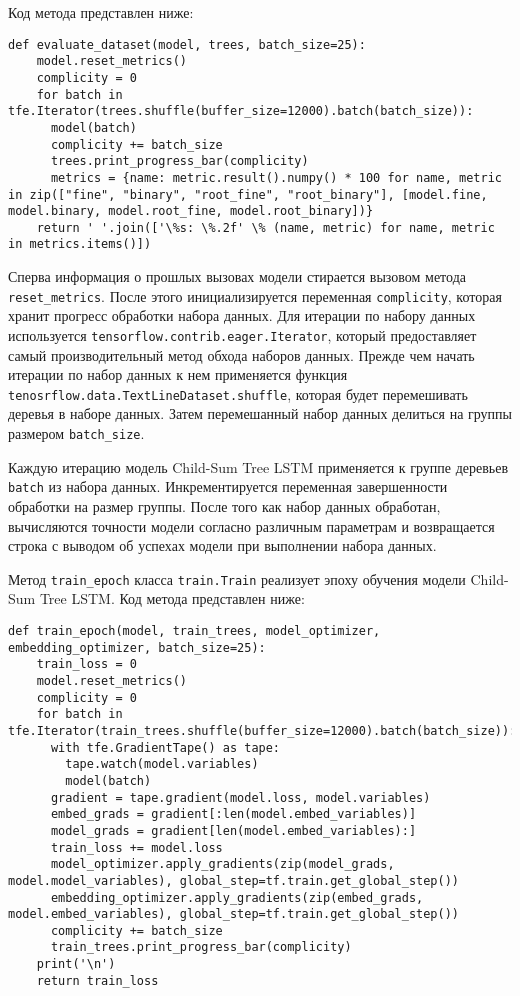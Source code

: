 Код метода представлен ниже:
\medskip
\begin{lstlisting}[style=Python]
  def evaluate_dataset(model, trees, batch_size=25):
    model.reset_metrics()
    complicity = 0
    for batch in tfe.Iterator(trees.shuffle(buffer_size=12000).batch(batch_size)):
      model(batch)
      complicity += batch_size
      trees.print_progress_bar(complicity)
      metrics = {name: metric.result().numpy() * 100 for name, metric in zip(["fine", "binary", "root_fine", "root_binary"], [model.fine, model.binary, model.root_fine, model.root_binary])}
    return ' '.join(['\%s: \%.2f' \% (name, metric) for name, metric in metrics.items()])
\end{lstlisting}
\medskip

Сперва информация о прошлых вызовах модели стирается вызовом метода \texttt{reset\_metrics}. После этого инициализируется переменная \texttt{comp\-licity}, которая хранит прогресс обработки набора данных. Для итерации по набору данных используется \texttt{tensorflow.contrib.eager.Iterat\-or}, который предоставляет самый производительный метод обхода наборов данных. Прежде чем начать итерации по набор данных к нем применяется функция \texttt{tenosr\-flow.data.TextLineDataset.shuffle}, которая будет перемешивать деревья в наборе данных. Затем перемешанный набор данных делиться на группы размером \texttt{batch\_size}.

Каждую итерацию модель Child-Sum Tree LSTM применяется к группе деревьев \texttt{batch} из набора данных. Инкрементируется переменная завершенности обработки на размер группы. После того как набор данных обработан, вычисляются точности модели согласно различным параметрам и возвращается строка с выводом об успехах модели при выполнении набора данных.

Метод \texttt{train\_epoch} класса \texttt{train.Train} реализует эпоху обучения модели Child-Sum Tree LSTM\@. Код метода представлен ниже:
\medskip
\begin{lstlisting}[style=Python]
  def train_epoch(model, train_trees, model_optimizer, embedding_optimizer, batch_size=25):
    train_loss = 0
    model.reset_metrics()
    complicity = 0
    for batch in tfe.Iterator(train_trees.shuffle(buffer_size=12000).batch(batch_size)):
      with tfe.GradientTape() as tape:
        tape.watch(model.variables)
        model(batch)
      gradient = tape.gradient(model.loss, model.variables)
      embed_grads = gradient[:len(model.embed_variables)]
      model_grads = gradient[len(model.embed_variables):]
      train_loss += model.loss
      model_optimizer.apply_gradients(zip(model_grads, model.model_variables), global_step=tf.train.get_global_step())
      embedding_optimizer.apply_gradients(zip(embed_grads, model.embed_variables), global_step=tf.train.get_global_step())
      complicity += batch_size
      train_trees.print_progress_bar(complicity)
    print('\n')
    return train_loss
\end{lstlisting}
\medskip

